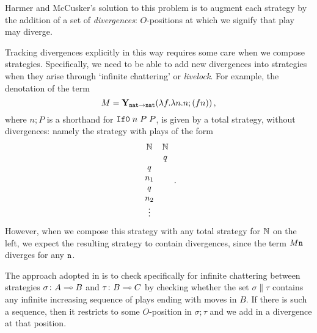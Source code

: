 \documentclass[sigplan,10pt,review]{acmart}\settopmatter{printfolios=true,printccs=false,printacmref=false}
\begin{document}
Harmer and McCusker's solution to this problem is to augment each strategy by the addition of a set of \emph{divergences}: $O$-positions at which we signify that play may diverge.  

Tracking divergences explicitly in this way requires some care when we compose strategies.  
Specifically, we need to be able to add new divergences into strategies when they arise through `infinite chattering' or \emph{livelock}.  
For example, the denotation of the term
\[
  M = \mathbf{Y}_{{\mathtt{nat}}\to{\mathtt{nat}}}(\lambda f.\lambda n.n;(f n))\,,
  \]
where $n;P$ is a shorthand for ${\mathtt{If0}\;} n\;P\;P$, is given by a total strategy, without divergences: namely the strategy with plays of the form
\[
  \begin{array}{cc}
    \mathbf{\mathbb{N}} & \mathbf{\mathbb{N}} \\
    & q \\
    q & \\
    n_1 & \\
    q & \\
    n_2 & \\
    \vdots &
  \end{array}\,.
  \]
However, when we compose this strategy with any total strategy for $\mathbb{N}$ on the left, we expect the resulting strategy to contain divergences, since the term $M {\mathtt{n}}$ diverges for any ${\mathtt{n}}$.

The approach adopted in \cite{mcCHFiniteND} is to check specifically for infinite chattering between strategies $\sigma\colon A\multimap B$ and $\tau\colon B\multimap C$ by checking whether the set $\sigma\|\tau$ contains any infinite increasing sequence of plays ending with moves in $B$.  
If there is such a sequence, then it restricts to some $O$-position in $\sigma;\tau$ and we add in a divergence at that position.  
\end{document}
